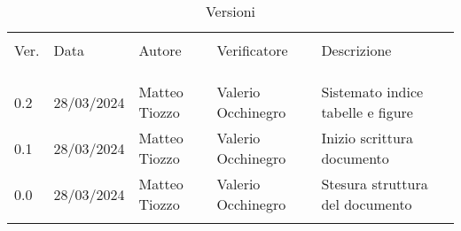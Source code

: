 \documentclass[italian,12pt]{article} %
\begin{document}


\newpage



\begin{table}[!h]
    \caption*{Versioni}
    \begin{center}
        \begin{tabular}{ l l l l l }
            \hline                                                                                                          \\[-2ex]
            Ver. & Data       & Autore          & Verificatore        & Descrizione                                   \\
            \\[-2ex] \hline \\[-1.5ex]\\
            0.2  & 28/03/2024 & Matteo Tiozzo   & Valerio Occhinegro  & Sistemato indice tabelle e figure\\
            0.1  & 28/03/2024 & Matteo Tiozzo   & Valerio Occhinegro  & Inizio scrittura documento                    \\
            0.0  & 28/03/2024 & Matteo Tiozzo   & Valerio Occhinegro  & Stesura struttura del documento               \\
            \\[-1.5ex] \hline
        \end{tabular}
    \end{center}
\end{table}

\newpage

\tableofcontents

\newpage

\listoftables

\listoffigures

\newpage




\end{document}
